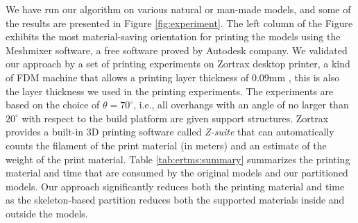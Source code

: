 We have run our algorithm on various natural or man-made models, and some of the results are presented in Figure \ref{fig:experiment}. The left column of the Figure exhibits the most material-saving orientation for printing the models using the Meshmixer software, a free software proved by Autodesk company. We validated our approach by a set of printing experiments on Zortrax desktop printer, a kind of FDM machine that allows a printing layer thickness of 0.09mm , this is also the layer thickness we used in the printing experiments. The experiments are based on the choice of $\theta = 70^{\circ}$, i.e., all overhangs with an angle of no larger than $20^{\circ}$ with respect to the build platform are given support structures. Zortrax provides a built-in 3D printing software called \emph{Z-suite} that can automatically counts the filament of the print material (in meters) and an estimate of the weight of the print material. Table \ref{tab:ertms:summary} summarizes the printing material and time that are consumed by the original models and our partitioned models. Our approach significantly reduces both the printing material and time as the skeleton-based partition reduces both the supported materials inside and outside the models.


